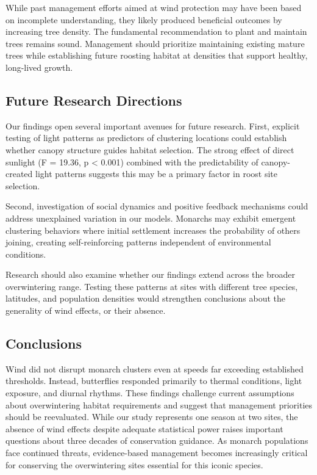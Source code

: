 While past management efforts aimed at wind protection may have been based on incomplete understanding, they likely produced beneficial outcomes by increasing tree density. The fundamental recommendation to plant and maintain trees remains sound. Management should prioritize maintaining existing mature trees while establishing future roosting habitat at densities that support healthy, long-lived growth.

\subsection{Future Research Directions}

Our findings open several important avenues for future research. First, explicit testing of light patterns as predictors of clustering locations could establish whether canopy structure guides habitat selection. The strong effect of direct sunlight (F = 19.36, p < 0.001) combined with the predictability of canopy-created light patterns suggests this may be a primary factor in roost site selection.

Second, investigation of social dynamics and positive feedback mechanisms could address unexplained variation in our models. Monarchs may exhibit emergent clustering behaviors where initial settlement increases the probability of others joining, creating self-reinforcing patterns independent of environmental conditions.

Research should also examine whether our findings extend across the broader overwintering range. Testing these patterns at sites with different tree species, latitudes, and population densities would strengthen conclusions about the generality of wind effects, or their absence.

\subsection{Conclusions}

Wind did not disrupt monarch clusters even at speeds far exceeding established thresholds. Instead, butterflies responded primarily to thermal conditions, light exposure, and diurnal rhythms. These findings challenge current assumptions about overwintering habitat requirements and suggest that management priorities should be reevaluated. While our study represents one season at two sites, the absence of wind effects despite adequate statistical power raises important questions about three decades of conservation guidance. As monarch populations face continued threats, evidence-based management becomes increasingly critical for conserving the overwintering sites essential for this iconic species.